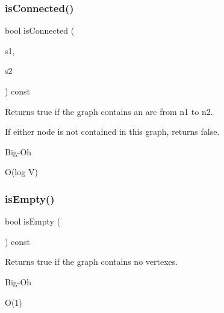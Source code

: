 \subsubsection{\texorpdfstring{is\+Connected()}{isConnected()}\hspace{0.1cm}{\footnotesize\ttfamily [2/2]}}
{\footnotesize\ttfamily bool is\+Connected (\begin{DoxyParamCaption}\item[{const std\+::string \&}]{s1,  }\item[{const std\+::string \&}]{s2 }\end{DoxyParamCaption}) const\hspace{0.3cm}{\ttfamily [inherited]}}



Returns {\ttfamily true} if the graph contains an arc from {\ttfamily n1} to {\ttfamily n2}. 

If either node is not contained in this graph, returns false. \begin{DoxyRefDesc}{Big-\/\+Oh}
\item[\mbox{\hyperlink{BigOh__BigOh000079}{Big-\/\+Oh}}]O(log V) \end{DoxyRefDesc}
\mbox{\label{classGraph_acf82f9b2937375c7b1cf3dccb3df3312}} 
\subsubsection{\texorpdfstring{is\+Empty()}{isEmpty()}}
{\footnotesize\ttfamily bool is\+Empty (\begin{DoxyParamCaption}{ }\end{DoxyParamCaption}) const\hspace{0.3cm}{\ttfamily [inherited]}}



Returns {\ttfamily true} if the graph contains no vertexes. 

\begin{DoxyRefDesc}{Big-\/\+Oh}
\item[\mbox{\hyperlink{BigOh__BigOh000082}{Big-\/\+Oh}}]O(1) \end{DoxyRefDesc}
\mbox{\label{classGraph_ab160bb64995133f6feb351cb23b031fb}} 
